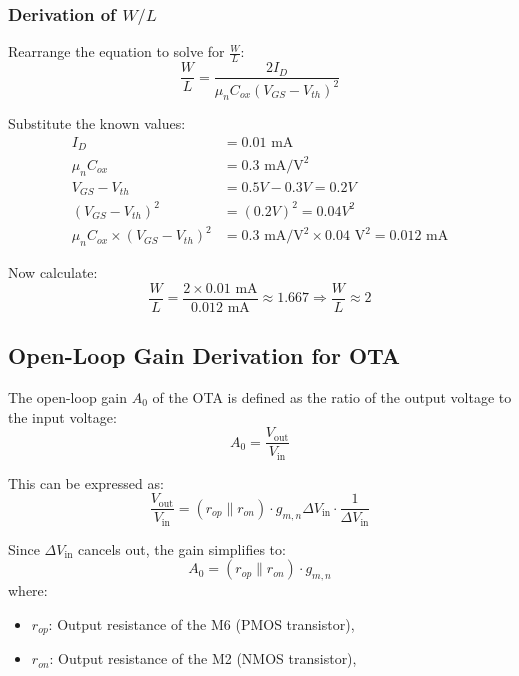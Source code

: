 \subsubsection{Derivation of $W/L$}

Rearrange the equation to solve for $\frac{W}{L}$:
\begin{equation}
    \frac{W}{L} = \frac{2 I_D}{\mu_n C_{ox} (V_{GS} - V_{th})^2}
\end{equation}

Substitute the known values:
\begin{align*}
    I_D &= 0.01 \text{ mA} \\
    \mu_n C_{ox} &= 0.3 \text{ mA}/\text{V}^2 \\
    V_{GS} - V_{th} &= 0.5V - 0.3V = 0.2V \\
    (V_{GS} - V_{th})^2 &= (0.2V)^2 = 0.04V^2 \\
    \mu_n C_{ox} \times (V_{GS} - V_{th})^2 &= 0.3 \text{ mA}/\text{V}^2 \times 0.04 \text{ V}^2 = 0.012 \text{ mA}
\end{align*}

Now calculate:
\begin{equation}
    \frac{W}{L} = \frac{2 \times 0.01 \text{ mA}}{0.012 \text{ mA}} \approx 1.667 \Rightarrow \frac{W}{L} \approx 2
\end{equation}

\subsection{Open-Loop Gain Derivation for OTA}
The open-loop gain $A_0$ of the OTA is defined as the ratio of the output voltage to the input voltage:
\begin{equation}
    A_0 = \frac{V_{\text{out}}}{V_{\text{in}}}
\end{equation}

This can be expressed as:
\begin{equation}
    \frac{V_{\text{out}}}{V_{\text{in}}} = (r_{op} \parallel r_{on}) \cdot g_{m,n} \Delta V_{\text{in}} \cdot \frac{1}{\Delta V_{\text{in}}}
\end{equation}

Since $\Delta V_{\text{in}}$ cancels out, the gain simplifies to:
\begin{equation}
    A_0 = (r_{op} \parallel r_{on}) \cdot g_{m,n}
\end{equation}
where:
\begin{itemize}
    \item $r_{op}$: Output resistance of the M6 (PMOS transistor),
    \item $r_{on}$: Output resistance of the M2 (NMOS transistor),
\end{itemize}

